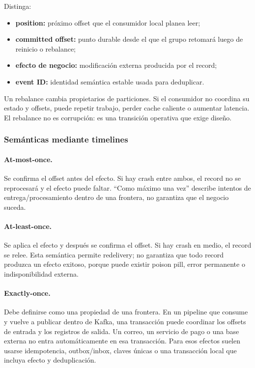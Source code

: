 \documentclass[variant=docente,cover=institutional,mode=screen]{ua-engineering-v6-article}
\begin{document}
Distinga:
\begin{itemize}
\item \textbf{position:} próximo offset que el consumidor local planea leer;
\item \textbf{committed offset:} punto durable desde el que el grupo retomará luego de reinicio o rebalance;
\item \textbf{efecto de negocio:} modificación externa producida por el record;
\item \textbf{event ID:} identidad semántica estable usada para deduplicar.
\end{itemize}

Un rebalance cambia propietarios de particiones. Si el consumidor no coordina su estado y offsets, puede repetir trabajo, perder cache caliente o aumentar latencia. El rebalance no es corrupción: es una transición operativa que exige diseño.

\subsubsection{Semánticas mediante timelines}

\paragraph{At-most-once.}
Se confirma el offset antes del efecto. Si hay crash entre ambos, el record no se reprocesará y el efecto puede faltar. ``Como máximo una vez'' describe intentos de entrega/procesamiento dentro de una frontera, no garantiza que el negocio suceda.

\paragraph{At-least-once.}
Se aplica el efecto y después se confirma el offset. Si hay crash en medio, el record se relee. Esta semántica permite redelivery; no garantiza que todo record produzca un efecto exitoso, porque puede existir poison pill, error permanente o indisponibilidad externa.

\paragraph{Exactly-once.}
Debe definirse como una propiedad de una frontera. En un pipeline que consume y vuelve a publicar dentro de Kafka, una transacción puede coordinar los offsets de entrada y los registros de salida. Un correo, un servicio de pago o una base externa no entra automáticamente en esa transacción. Para esos efectos suelen usarse idempotencia, outbox/inbox, claves únicas o una transacción local que incluya efecto y deduplicación.
\end{document}
